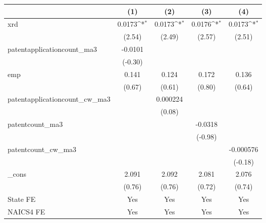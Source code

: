 {
\def\sym#1{\ifmmode^{#1}\else\(^{#1}\)\fi}
\begin{tabular}{l*{4}{c}}
\hline\hline
            &\multicolumn{1}{c}{(1)}         &\multicolumn{1}{c}{(2)}         &\multicolumn{1}{c}{(3)}         &\multicolumn{1}{c}{(4)}         \\
\hline
xrd         &      0.0173\sym{*}  &      0.0173\sym{*}  &      0.0176\sym{*}  &      0.0173\sym{*}  \\
            &      (2.54)         &      (2.49)         &      (2.57)         &      (2.51)         \\
[1em]
patentapplicationcount\_ma3&     -0.0101         &                     &                     &                     \\
            &     (-0.30)         &                     &                     &                     \\
[1em]
emp         &       0.141         &       0.124         &       0.172         &       0.136         \\
            &      (0.67)         &      (0.61)         &      (0.80)         &      (0.64)         \\
[1em]
patentapplicationcount\_cw\_ma3&                     &    0.000224         &                     &                     \\
            &                     &      (0.08)         &                     &                     \\
[1em]
patentcount\_ma3&                     &                     &     -0.0318         &                     \\
            &                     &                     &     (-0.98)         &                     \\
[1em]
patentcount\_cw\_ma3&                     &                     &                     &   -0.000576         \\
            &                     &                     &                     &     (-0.18)         \\
[1em]
\_cons      &       2.091         &       2.092         &       2.081         &       2.076         \\
            &      (0.76)         &      (0.76)         &      (0.72)         &      (0.74)         \\
[1em]
State FE    &         Yes         &         Yes         &         Yes         &         Yes         \\
[1em]
NAICS4 FE   &         Yes         &         Yes         &         Yes         &         Yes         \\

\end{tabular}}
